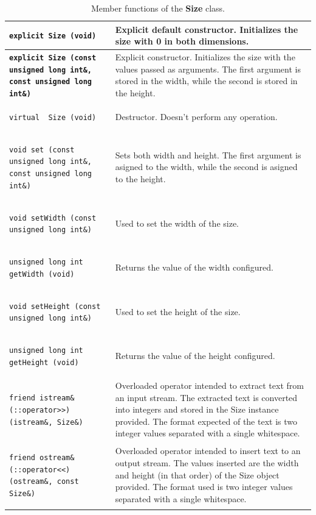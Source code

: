 \documentclass[11pt,twoside,openany,x11names,svgnames]{memoir}
\begin{document}
\begin{table}[h]\footnotesize
\centering
\begin{tabular}{| >{\bfseries}p{11cm} | p{4.5cm} |}
	\hline
	
	\texttt{explicit Size (void)} & Explicit default constructor. Initializes the size with 0 in both dimensions. \\
	
	\hline
	
	\texttt{explicit Size (const unsigned long int\&, const unsigned long int\&)} & Explicit constructor. Initializes the size with the values passed as arguments. The first argument is stored in the width, while the second is stored in the height. \\
	
	\hline
	
	\texttt{virtual ~Size (void)} & Destructor. Doesn't perform any operation. \\
	
	\hline
	
	\texttt{void set (const unsigned long int\&, const unsigned long int\&)} & Sets both width and height. The first argument is asigned to the width, while the second is asigned to the height. \\
	
	\hline	
	
	\texttt{void setWidth (const unsigned long int\&)} & Used to set the width of the size. \\
	
	\hline
	
	\texttt{unsigned long int getWidth (void)} & Returns the value of the width configured. \\
	
	\hline	
	
	\texttt{void setHeight (const unsigned long int\&)} & Used to set the height of the size. \\
	
	\hline
	
	\texttt{unsigned long int getHeight (void)} & Returns the value of the height configured. \\
	
	\hline
	
	\texttt{friend istream\& (::operator>>) (istream\&, Size\&)} & Overloaded operator intended to extract text from an input stream. The extracted text is converted into integers and stored in the Size instance provided. The format expected of the text is two integer values separated with a single whitespace. \\
	
	\hline
	
	\texttt{friend ostream\& (::operator<<) (ostream\&, const Size\&)} & Overloaded operator intended to insert text to an output stream. The values inserted are the width and height (in that order) of the Size object provided. The format used is two integer values separated with a single whitespace. \\
	
	\hline
\end{tabular}
\caption{Member functions of the \textbf{Size} class.}
\label{tab:Size-MemberFunctions}
\end{table}
\end{document}
